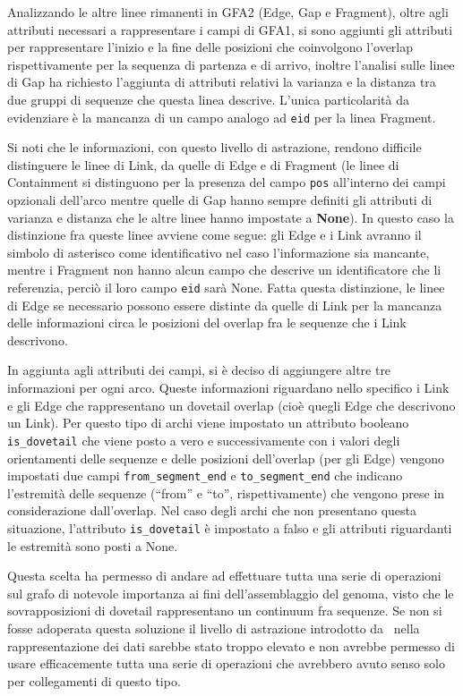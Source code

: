 Analizzando le altre linee rimanenti in GFA2 (Edge, Gap e Fragment), oltre agli attributi
necessari a rappresentare i campi di GFA1, si sono aggiunti gli attributi per
rappresentare l'inizio e la fine delle posizioni che coinvolgono l'overlap rispettivamente
per la sequenza di partenza e di arrivo, inoltre l'analisi sulle linee di Gap
ha richiesto l'aggiunta di attributi relativi la varianza e la distanza tra due gruppi
di sequenze che questa linea
descrive. L'unica particolarità da evidenziare è la mancanza di un campo
analogo ad \texttt{eid} per la linea Fragment.

Si noti che le informazioni, con questo livello di astrazione, rendono difficile distinguere
le linee di Link, da quelle di Edge e di Fragment (le linee di Containment si distinguono
per la presenza del campo \texttt{pos} all'interno dei campi opzionali dell'arco mentre
quelle di Gap hanno sempre definiti gli attributi di varianza e distanza che le altre linee
hanno impostate a \textbf{None}). In questo caso la distinzione fra queste linee avviene
come segue: gli Edge e i Link avranno il simbolo di asterisco come
identificativo nel caso l'informazione sia mancante,  mentre i Fragment
non hanno alcun campo che descrive un identificatore che li referenzia, perciò
il loro campo \texttt{eid} sarà None. Fatta questa distinzione, le linee di Edge se necessario
possono essere distinte da quelle di Link per la mancanza delle informazioni
circa le posizioni del overlap fra le sequenze che i Link descrivono.

In aggiunta agli attributi dei campi, si è deciso di aggiungere altre
tre informazioni per ogni arco.
Queste informazioni riguardano nello specifico i Link e gli Edge che
rappresentano un dovetail overlap (cioè quegli Edge che descrivono un Link).
Per questo tipo di archi viene impostato un attributo booleano \texttt{is\_dovetail}
che viene posto a vero e successivamente con i valori degli orientamenti
delle sequenze e delle posizioni dell'overlap (per gli Edge) vengono impostati
due campi \texttt{from\_segment\_end} e \texttt{to\_segment\_end} che indicano
l'estremità delle sequenze (``from'' e ``to'', rispettivamente) che vengono
prese in considerazione dall'overlap. Nel caso degli archi che non presentano
questa situazione, l'attributo \texttt{is\_dovetail} è impostato a falso e
gli attributi riguardanti le estremità sono posti a None.

Questa scelta ha permesso di andare ad effettuare tutta una serie di operazioni
sul grafo di notevole importanza ai fini dell'assemblaggio del genoma, visto che
le sovrapposizioni di dovetail rappresentano un continuum fra sequenze.
Se non si fosse adoperata questa soluzione il livello di astrazione introdotto da \pygfa \ 
nella rappresentazione dei dati sarebbe stato troppo elevato e non avrebbe
permesso di usare efficacemente tutta una serie di operazioni che avrebbero
avuto senso solo per collegamenti di questo tipo.

